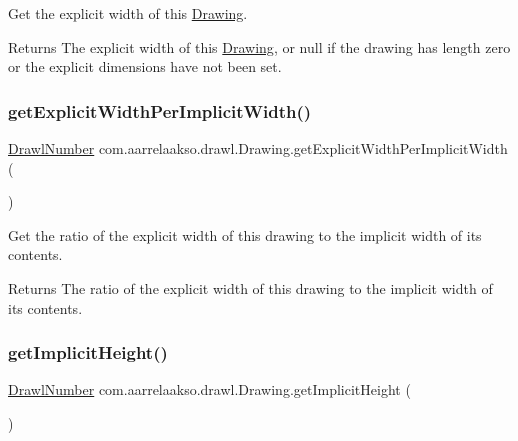 Get the explicit width of this \hyperlink{classcom_1_1aarrelaakso_1_1drawl_1_1_drawing}{Drawing}. 

\begin{DoxyReturn}{Returns}
The explicit width of this \hyperlink{classcom_1_1aarrelaakso_1_1drawl_1_1_drawing}{Drawing}, or null if the drawing has length zero or the explicit dimensions have not been set. 
\end{DoxyReturn}
\mbox{\label{classcom_1_1aarrelaakso_1_1drawl_1_1_drawing_ab578293cefe01c28b1e4d8ea28f85e05}} 
\subsubsection{\texorpdfstring{get\+Explicit\+Width\+Per\+Implicit\+Width()}{getExplicitWidthPerImplicitWidth()}}
{\footnotesize\ttfamily \hyperlink{classcom_1_1aarrelaakso_1_1drawl_1_1_drawl_number}{Drawl\+Number} com.\+aarrelaakso.\+drawl.\+Drawing.\+get\+Explicit\+Width\+Per\+Implicit\+Width (\begin{DoxyParamCaption}{ }\end{DoxyParamCaption})}



Get the ratio of the explicit width of this drawing to the implicit width of its contents. 

\begin{DoxyReturn}{Returns}
The ratio of the explicit width of this drawing to the implicit width of its contents. 
\end{DoxyReturn}
\mbox{\label{classcom_1_1aarrelaakso_1_1drawl_1_1_drawing_ae45ca0e4dbfe162f10995bc307b098ec}} 
\subsubsection{\texorpdfstring{get\+Implicit\+Height()}{getImplicitHeight()}}
{\footnotesize\ttfamily \hyperlink{classcom_1_1aarrelaakso_1_1drawl_1_1_drawl_number}{Drawl\+Number} com.\+aarrelaakso.\+drawl.\+Drawing.\+get\+Implicit\+Height (\begin{DoxyParamCaption}{ }\end{DoxyParamCaption})}



